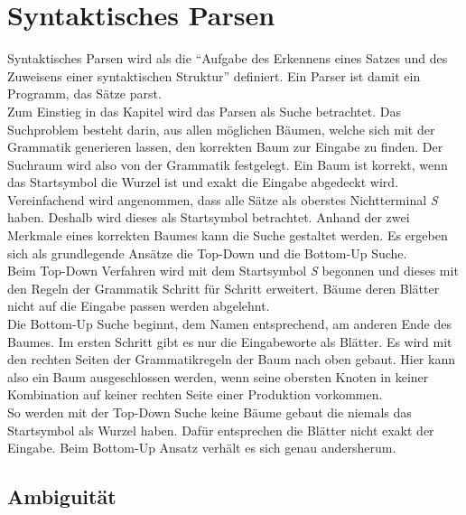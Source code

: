 \section{Syntaktisches Parsen}
\label{sec:nlp:syn-parsen}

Syntaktisches Parsen wird als die ``Aufgabe des Erkennens eines Satzes und des Zuweisens einer syntaktischen Struktur'' definiert. %
Ein Parser ist damit ein Programm, das Sätze parst.\\
Zum Einstieg in das Kapitel wird das Parsen als Suche betrachtet. Das Suchproblem besteht darin, aus allen möglichen Bäumen, welche sich mit der Grammatik generieren lassen, den korrekten Baum zur Eingabe zu finden. Der Suchraum wird also von der Grammatik festgelegt. Ein Baum ist korrekt, wenn das Startsymbol die Wurzel ist und exakt die Eingabe abgedeckt wird. Vereinfachend wird angenommen, dass alle Sätze als oberstes Nichtterminal \textit{S} haben. Deshalb wird dieses als Startsymbol betrachtet. Anhand der zwei Merkmale eines korrekten Baumes kann die Suche gestaltet werden. Es ergeben sich als grundlegende Ansätze die Top-Down und die Bottom-Up Suche. \\
Beim Top-Down Verfahren wird mit dem Startsymbol \textit{S} begonnen und dieses mit den Regeln der Grammatik Schritt für Schritt erweitert. Bäume deren Blätter nicht auf die Eingabe passen werden abgelehnt. \\
Die Bottom-Up Suche beginnt, dem Namen entsprechend, am anderen Ende des Baumes. Im ersten Schritt gibt es nur die Eingabeworte als Blätter. Es wird mit den rechten Seiten der Grammatikregeln der Baum nach oben gebaut. Hier kann also ein Baum ausgeschlossen werden, wenn seine obersten Knoten in keiner Kombination auf keiner rechten Seite einer Produktion vorkommen. \\
So werden mit der Top-Down Suche keine Bäume gebaut die niemals das Startsymbol als Wurzel haben. Dafür entsprechen die Blätter nicht exakt der Eingabe. Beim Bottom-Up Ansatz verhält es sich genau andersherum.
\subsection{Ambiguität}

